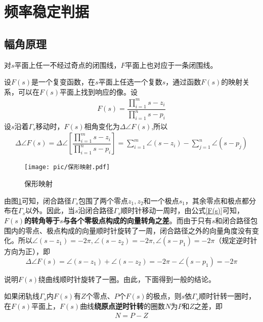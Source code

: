 \section{频率稳定判据}
\vspace*{-0.5em}
\subsection{幅角原理}
\ttheorem[保形映射定理]
对$s$平面上任一不经过奇点的闭围线，$F$平面上也对应于一条闭围线。

设$F(s)$是一个复变函数，在$s$平面上任选一个复数$s$，通过函数$F(s)$的映射关系，可以在$F(s)$平面上找到响应的像。设
\begin{align}
	 F(s) = \dfrac{\displaystyle \prod_{i = 1}^{m}s - z_i}{\displaystyle \prod_{i=1}^{n} s- p_i}
\end{align}
设$s$沿着$\Gamma_s$移动时，$F(s)$相角变化为$\Delta \angle F(s) $,所以
\begin{align}
	\Delta \angle F(s) = \Delta \angle \left[\dfrac{\displaystyle \prod_{i = 1}^{m}s - z_i}{\displaystyle \prod_{i=1}^{n} s- p_i} \right]= \sum_{i = 1}^{m} \angle (s - z_i) - \sum_{j = 1}^{n} \angle (s - p_j)
	\label{F(s)}
\end{align}


\begin{figure}[!htb]
	\centering
	\texttt{[image: pic/保形映射.pdf]}
	\caption{保形映射}
	\label{保形映射}
\end{figure}

由图\ref{保形映射}可知，闭合路径$\Gamma_s$包围了两个零点$z_1,z_2$和一个极点$s_1$，其余零点和极点都分布在$\Gamma_s$以外。因此，当$s$沿闭合路径$\Gamma_s$顺时针移动一周时，由公式\eqref{F(s)}可知，\textbf{$F(s)$的转角等于$s$与各个零极点构成的向量转角之差}。而由于只有$s$和闭合路径包围内的零点、极点构成的向量顺时针旋转了一周，闭合路径之外的向量角度没有变化。所以$\angle (s - z_1) = -2\pi, \angle (s - z_2) = -2 \pi, \angle (s - p_1) = -2 \pi$（规定逆时针方向为正），即
\[\Delta \angle F(s) = \angle (s - z_1) + \angle (s - z_2) = -2 \pi - \angle (s - p_1) = - 2 \pi\]

说明$F(s)$绕曲线顺时针旋转了一圈。由此，下面得到一般的结论。

\theorem[幅角原理]
如果闭轨线$\Gamma_s$内$F(s)$有$Z$个零点、$P$个$F(s)$的极点，则$s$依$\Gamma_s$顺时针转一圈时，在$F(s)$平面上，$F(s)$曲线\textbf{绕原点逆时针转}的圈数$N$为$P$和$Z$之差，即
\begin{align}
	N = P - Z
\end{align}

